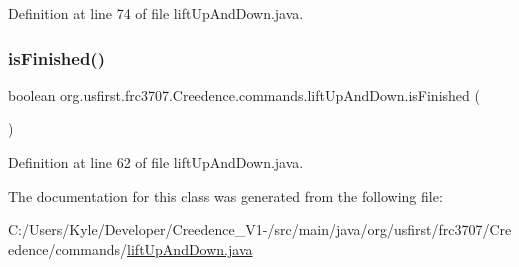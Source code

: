Definition at line 74 of file lift\+Up\+And\+Down.\+java.

\mbox{\label{classorg_1_1usfirst_1_1frc3707_1_1_creedence_1_1commands_1_1lift_up_and_down_adc60b6dd89b15d628419e53c4541d4a3}} 
\subsubsection{\texorpdfstring{isFinished()}{isFinished()}}
{\footnotesize\ttfamily boolean org.\+usfirst.\+frc3707.\+Creedence.\+commands.\+lift\+Up\+And\+Down.\+is\+Finished (\begin{DoxyParamCaption}{ }\end{DoxyParamCaption})\hspace{0.3cm}{\ttfamily [protected]}}



Definition at line 62 of file lift\+Up\+And\+Down.\+java.



The documentation for this class was generated from the following file\+:\begin{DoxyCompactItemize}
\item 
C\+:/\+Users/\+Kyle/\+Developer/\+Creedence\+\_\+\+V1-\//src/main/java/org/usfirst/frc3707/\+Creedence/commands/\mbox{\hyperlink{lift_up_and_down_8java}{lift\+Up\+And\+Down.\+java}}\end{DoxyCompactItemize}
